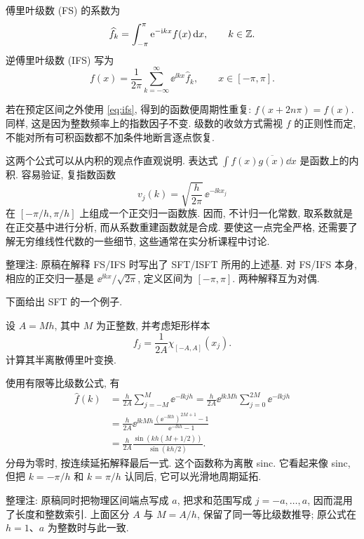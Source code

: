 \begin{definition}[傅里叶级数]
傅里叶级数 (FS) 的系数为
\begin{equation}\label{eq:fs}
\widehat f_k=\int_{-\pi}^{\pi}\mathrm e^{-\mathrm i kx}f(x)\,\mathrm d x,
\qquad k\in\mathbb Z.
\end{equation}
逆傅里叶级数 (IFS) 写为
\begin{equation}\label{eq:ifs}
f(x)=\frac1{2\pi}\sum_{k=-\infty}^{\infty}\ee^{\ii kx}\widehat f_k,
\qquad x\in[-\pi,\pi].
\end{equation}
\end{definition}

若在预定区间之外使用 \eqref{eq:ifs}, 得到的函数便周期性重复: $f(x+2n\pi)=f(x)$. 同样, 这是因为整数频率上的指数因子不变. 级数的收敛方式需视 $f$ 的正则性而定, 不能对所有可积函数都不加条件地断言逐点恢复.

这两个公式可以从内积的观点作直观说明. 表达式 $\int f(x)\overline{g(x)}\dd x$ 是函数上的内积. 容易验证, 复指数函数
\[
v_j(k)=\sqrt{\frac h{2\pi}}\,\ee^{-\ii kx_j}
\]
在 $[-\pi/h,\pi/h]$ 上组成一个正交归一函数族. 因而, 不计归一化常数, 取系数就是在正交基中进行分析, 而从系数重建函数就是合成. 要使这一点完全严格, 还需要了解无穷维线性代数的一些细节, 这些通常在实分析课程中讨论.
\begin{remark}
整理注: 原稿在解释 FS/IFS 时写出了 SFT/ISFT 所用的上述基. 对 FS/IFS 本身, 相应的正交归一基是 $\ee^{\ii kx}/\sqrt{2\pi}$, 定义区间为 $[-\pi,\pi]$. 两种解释互为对偶.
\end{remark}

下面给出 SFT 的一个例子.

\begin{example}\label{ex:discrete-sinc}
设 $A=Mh$, 其中 $M$ 为正整数, 并考虑矩形样本
\[
f_j=\frac1{2A}\chi_{[-A,A]}(x_j).
\]
计算其半离散傅里叶变换.
\end{example}
\begin{solution}
使用有限等比级数公式, 有
\begin{align*}
\widehat f(k)
&=\frac h{2A}\sum_{j=-M}^{M}\ee^{-\ii kjh}
=\frac h{2A}\ee^{\ii kMh}\sum_{j=0}^{2M}\ee^{-\ii kjh}\\
&=\frac h{2A}\ee^{\ii kMh}
\frac{(\ee^{-\ii kh})^{2M+1}-1}{\ee^{-\ii kh}-1}\\
&=\frac h{2A}\frac{\sin(kh(M+1/2))}{\sin(kh/2)}.
\end{align*}
分母为零时, 按连续延拓解释最后一式. 这个函数称为离散 sinc. 它看起来像 sinc, 但把 $k=-\pi/h$ 和 $k=\pi/h$ 认同后, 它可以光滑地周期延拓.
\end{solution}
\begin{remark}
整理注: 原稿同时把物理区间端点写成 $a$, 把求和范围写成 $j=-a,\ldots,a$, 因而混用了长度和整数索引. 上面区分 $A$ 与 $M=A/h$, 保留了同一等比级数推导; 原公式在 $h=1$、$a$ 为整数时与此一致.
\end{remark}

